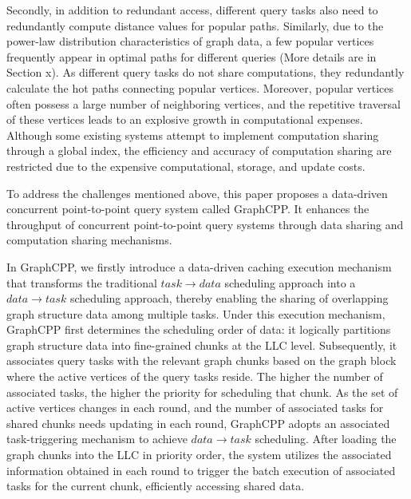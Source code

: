 \documentclass[lettersize,journal]{IEEEtran} %
\begin{document}
Secondly, in addition to redundant access, different query tasks also need to redundantly compute distance values for popular paths. Similarly, due to the power-law distribution characteristics of graph data, a few popular vertices frequently appear in optimal paths for different queries (More details are in Section x). As different query tasks do not share computations, they redundantly calculate the hot paths connecting popular vertices. Moreover, popular vertices often possess a large number of neighboring vertices, and the repetitive traversal of these vertices leads to an explosive growth in computational expenses. Although some existing systems attempt to implement computation sharing through a global index\cite{sgraph}\cite{tripoline}, the efficiency and accuracy of computation sharing are restricted due to the expensive computational, storage, and update costs.

To address the challenges mentioned above, this paper proposes a data-driven concurrent point-to-point query system called GraphCPP. It enhances the throughput of concurrent point-to-point query systems through data sharing and computation sharing mechanisms.

In GraphCPP, we firstly introduce a data-driven caching execution mechanism that transforms the traditional $task \rightarrow data$ scheduling approach into a $data \rightarrow task$ scheduling approach, thereby enabling the sharing of overlapping graph structure data among multiple tasks. Under this execution mechanism, GraphCPP first determines the scheduling order of data: it logically partitions graph structure data into fine-grained chunks at the LLC level. Subsequently, it associates query tasks with the relevant graph chunks based on the graph block where the active vertices of the query tasks reside. The higher the number of associated tasks, the higher the priority for scheduling that chunk. As the set of active vertices changes in each round, and the number of associated tasks for shared chunks needs updating in each round, GraphCPP adopts an associated task-triggering mechanism to achieve $data \rightarrow task$ scheduling. After loading the graph chunks into the LLC in priority order, the system utilizes the associated information obtained in each round to trigger the batch execution of associated tasks for the current chunk, efficiently accessing shared data.
\end{document}
